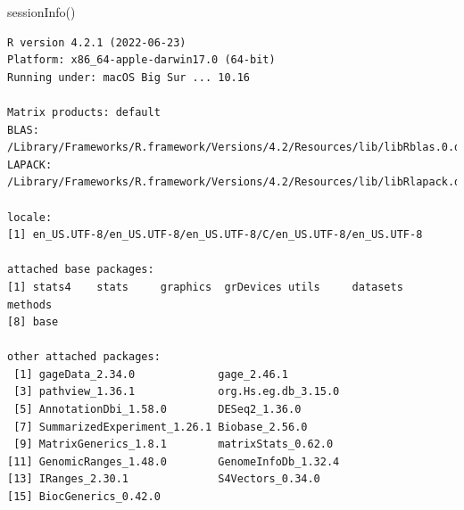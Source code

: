 \documentclass[
  letterpaper,
  DIV=11,
  numbers=noendperiod]{scrartcl}
\newenvironment{Shaded}{\begin{snugshade}}{\end{snugshade}}
\newcommand{\FunctionTok}[1]{\textcolor[rgb]{0.28,0.35,0.67}{#1}}
\newcommand{\NormalTok}[1]{\textcolor[rgb]{0.00,0.23,0.31}{#1}}
\begin{document}
\begin{Shaded}
\begin{Highlighting}[]
\FunctionTok{sessionInfo}\NormalTok{()}
\end{Highlighting}
\end{Shaded}

\begin{verbatim}
R version 4.2.1 (2022-06-23)
Platform: x86_64-apple-darwin17.0 (64-bit)
Running under: macOS Big Sur ... 10.16

Matrix products: default
BLAS:   /Library/Frameworks/R.framework/Versions/4.2/Resources/lib/libRblas.0.dylib
LAPACK: /Library/Frameworks/R.framework/Versions/4.2/Resources/lib/libRlapack.dylib

locale:
[1] en_US.UTF-8/en_US.UTF-8/en_US.UTF-8/C/en_US.UTF-8/en_US.UTF-8

attached base packages:
[1] stats4    stats     graphics  grDevices utils     datasets  methods  
[8] base     

other attached packages:
 [1] gageData_2.34.0             gage_2.46.1                
 [3] pathview_1.36.1             org.Hs.eg.db_3.15.0        
 [5] AnnotationDbi_1.58.0        DESeq2_1.36.0              
 [7] SummarizedExperiment_1.26.1 Biobase_2.56.0             
 [9] MatrixGenerics_1.8.1        matrixStats_0.62.0         
[11] GenomicRanges_1.48.0        GenomeInfoDb_1.32.4        
[13] IRanges_2.30.1              S4Vectors_0.34.0           
[15] BiocGenerics_0.42.0        


\end{verbatim}
\end{document}
